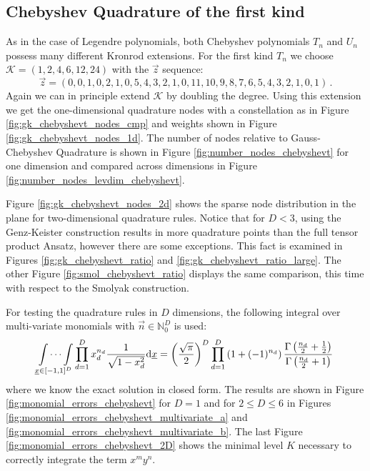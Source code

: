 \documentclass[a4paper,10pt]{article}
\begin{document}
\FloatBarrier
\subsection{Chebyshev Quadrature of the first kind}

As in the case of Legendre polynomials, both Chebyshev polynomials $T_n$
and $U_n$ possess many different Kronrod extensions. For the first kind $T_n$
we choose $\mathcal{K} = (1, 2, 4, 6, 12, 24)$ with the $\vec{z}$ sequence:
\begin{equation*}
  \vec{z} = (0, 0, 1, 0, 2, 1, 0, 5, 4, 3, 2, 1, 0, 11, 10, 9, 8, 7, 6, 5, 4, 3, 2, 1, 0, 1) \,.
\end{equation*}
Again we can in principle extend $\mathcal{K}$ by doubling the degree.
Using this extension we get the one-dimensional quadrature nodes
with a constellation as in Figure \ref{fig:gk_chebyshevt_nodes_cmp}
and weights shown in Figure \ref{fig:gk_chebyshevt_nodes_1d}.
The number of nodes relative to Gauss-Chebyshev Quadrature is shown
in Figure \ref{fig:number_nodes_chebyshevt} for one dimension and
compared across dimensions in Figure \ref{fig:number_nodes_levdim_chebyshevt}.

Figure \ref{fig:gk_chebyshevt_nodes_2d} shows the sparse
node distribution in the plane for two-dimensional quadrature rules.
Notice that for $D < 3$, using the Genz-Keister construction results
in more quadrature points than the full tensor product Ansatz, however there
are some exceptions. This fact is examined in Figures \ref{fig:gk_chebyshevt_ratio}
and \ref{fig:gk_chebyshevt_ratio_large}. The other Figure
\ref{fig:smol_chebyshevt_ratio} displays the same comparison,
this time with respect to the Smolyak construction.

For testing the quadrature rules in $D$ dimensions, the following integral
over multi-variate monomials with $\vec{n} \in \mathbb{N}_0^D$ is used:
\begin{equation} \label{eq:chebyshevt_exact_solution}
  \idotsint \limits_{\underline{x} \in [-1,1]^D} \prod_{d=1}^D x_d^{n_d} \frac{1}{\sqrt{1-x_d^2}} \mathrm{d}\underline{x}
  =
  \left(\frac{\sqrt{\pi}}{2}\right)^D
  \prod_{d=1}^D \left(1 + (-1)^{n_d}\right)
  \frac{\Gamma\left(\frac{n_d}{2}+\frac{1}{2}\right)}
       {\Gamma\left(\frac{n_d}{2}+1\right)}
\end{equation}
where we know the exact solution in closed form. The results are shown in
Figure \ref{fig:monomial_errors_chebyshevt} for $D=1$ and for $2 \leq D \leq 6$
in Figures \ref{fig:monomial_errors_chebyshevt_multivariate_a} and
\ref{fig:monomial_errors_chebyshevt_multivariate_b}.
The last Figure \ref{fig:monomial_errors_chebyshevt_2D} shows the minimal
level $K$ necessary to correctly integrate the term $x^m y^n$.
\end{document}
